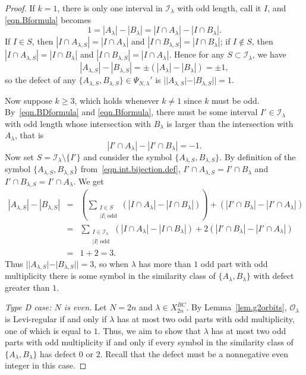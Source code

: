 \documentclass[reqno,11pt]{amsart}
\theoremstyle{remark}
\theoremstyle{remark}
\theoremstyle{definition}
\theoremstyle{definition}
\theoremstyle{definition}
\numberwithin{equation}{section}
\newcommand{\ci}{\mathcal{I}}
\newcommand{\co}{\mathcal{O}}
\begin{document}
\begin{proof}
If $k = 1$, there is only one interval in $\ci_\lambda$ with odd length, call it $I$, and \eqref{eqn.Bformula} becomes
$$
1 = |A_\lambda| - |B_\lambda| =  |I\cap A_\lambda| - |I\cap B_\lambda|.
$$
If $I \in S$, then  $ |I \cap A_{\lambda, S}| = |I\cap A_\lambda|$ and $|I \cap B_{\lambda, S}| = |I\cap B_\lambda|$;
if $I \not\in S$, then $ |I \cap A_{\lambda, S}| = |I\cap B_\lambda|$ and $|I \cap B_{\lambda, S}| = |I\cap A_\lambda|$.
Hence for any $S \subset \ci_\lambda$, we have
$$
|A_{\lambda, S}| - |B_{\lambda, S}| = \pm ( |A_\lambda| - |B_\lambda| ) = \pm 1,
$$
so the defect of any $\{ A_{\lambda, S}, B_{\lambda, S} \}\in \Psi_{N,\lambda}'$ is $| |A_{\lambda, S}| - |B_{\lambda, S}| | = 1$.

Now suppose $k\geq 3$, which holds whenever $k\neq 1$ since $k$ must be odd. By~\eqref{eqn.BDformula} and \eqref{eqn.Bformula}, there must be some interval $I'\in \ci_\lambda$ with odd length whose intersection with $B_\lambda$ is larger than the intersection with $A_\lambda$, that is
\[
|I' \cap A_\lambda| - |I' \cap B_\lambda| = -1. 
\]
Now set $S=\ci_\lambda \setminus \{I'\}$ and consider the symbol $\{A_{\lambda, S}, B_{\lambda, S}\}$.  By definition of the symbol $\{A_{\lambda, S}, B_{\lambda, S}\}$ from~\eqref{eqn.int.bijection.def}, $ I'\cap A_{\lambda, S}  =I' \cap B_\lambda $ and $I' \cap B_{\lambda, S} =I'\cap  A_\lambda$.  We get 
\begin{eqnarray*}
|A_{\lambda, S}| - |B_{\lambda, S}| &=& \left(  \sum_{\substack{I \in S \\ |I| \text{ odd}}} \left( |I\cap A_\lambda| - |I\cap B_\lambda| \right) \right) + \left( |I'\cap B_\lambda| - |I'\cap A_\lambda| \right) \\
&=& \sum_{\substack{I \in \ci_\lambda \\ |I| \text{ odd}}}\left( |I\cap A_\lambda| - |I\cap B_\lambda| \right) + 2\left( |I'\cap B_\lambda| - |I'\cap A_\lambda| \right) \\
&=& 1+2=3.
\end{eqnarray*}
Thus $||A_{\lambda, S}| - |B_{\lambda, S}||=3$, so when $\lambda$ has more than $1$ odd part with odd multiplicity there is some symbol in the similarity class of $\{A_\lambda, B_\lambda\}$ with defect greater than $1$.

\medskip

\textit{Type D case: $N$ is even.} Let $N=2n$ and $\lambda \in X_{2n}^{BC}$. By Lemma~\ref{lem.g2orbits}, $\co_\lambda$ is Levi-regular
if and only if $\lambda$ has at most two odd parts with odd multiplicity, one of which is equal to $1$. Thus, we aim to show that $\lambda$ has at most two odd parts with odd multiplicity if and only if every symbol in the similarity class of $\{A_\lambda, B_\lambda\}$ has defect $0$ or $2$. Recall that the defect must be a nonnegative even integer in this case.


\end{proof}
\end{document}
